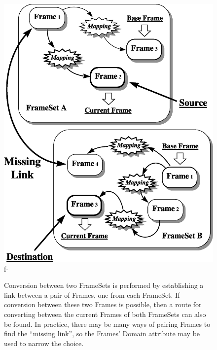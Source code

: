 \documentclass[twoside,11pt]{article}
\newenvironment{latexonly}{}{}
\begin{document}
\begin{latexonly}
\begin{figure}
\begin{center}
   \includegraphics[scale=0.6]{sun210_figures/fsalign.eps}
f-
   \caption{Conversion between two FrameSets is performed by establishing
   a link between a pair of Frames, one from each FrameSet. If conversion
   between these two Frames is possible, then a route for converting
   between the current Frames of both FrameSets can also be found. In
   practice, there may be many ways of pairing Frames to find the
   ``missing link'', so the Frames' Domain attribute may be used to
   narrow the choice.}
   \label{fig:fsalign}
   \end{center}
   \end{figure}
\end{latexonly}
\end{document}
